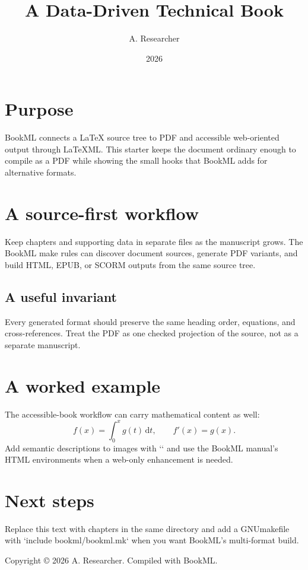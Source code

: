 \documentclass[british,oneside,11pt]{amsart}
\title{A Data-Driven Technical Book}
\author{A. Researcher}
\date{2026}
\begin{document}
\maketitle
\tableofcontents

\section{Purpose}
BookML connects a LaTeX source tree to PDF and accessible web-oriented output
through LaTeXML. This starter keeps the document ordinary enough to compile as
a PDF while showing the small hooks that BookML adds for alternative formats.

\section{A source-first workflow}
Keep chapters and supporting data in separate files as the manuscript grows.
The BookML make rules can discover document sources, generate PDF variants,
and build HTML, EPUB, or SCORM outputs from the same source tree.

\subsection{A useful invariant}
Every generated format should preserve the same heading order, equations, and
cross-references. Treat the PDF as one checked projection of the source, not
as a separate manuscript.

\section{A worked example}
The accessible-book workflow can carry mathematical content as well:
\[
  f(x) = \int_{0}^{x} g(t)\,\mathrm{d}t,
  \qquad f'(x)=g(x).
\]
Add semantic descriptions to images with `\bmlDescription` and use the
BookML manual's HTML environments when a web-only enhancement is needed.

\section{Next steps}
Replace this text with chapters in the same directory and add a GNUmakefile
with `include bookml/bookml.mk` when you want BookML's multi-format build.

\iflatexml\else
  \bigskip
  \begin{center}
    {\small Copyright \copyright{} 2026 A. Researcher. Compiled with BookML.}
  \end{center}
\fi
\end{document}
